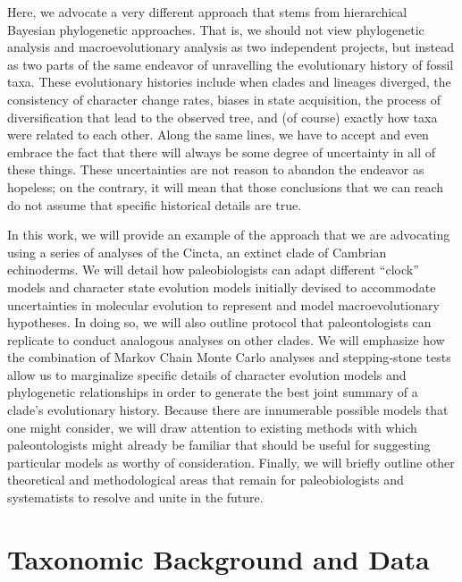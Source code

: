 \documentclass{article}
\begin{document}
Here, we advocate a very different approach that stems from hierarchical Bayesian phylogenetic approaches.  
That is, we should not view phylogenetic analysis and macroevolutionary analysis as two independent projects, but instead as two parts of the same endeavor of unravelling the evolutionary history of fossil taxa.  
These evolutionary histories include when clades and lineages diverged, the consistency of character change rates, biases in state acquisition, the process of diversification that lead to the observed tree, and (of course) exactly how taxa were related to each other.  
Along the same lines, we have to accept and even embrace the fact that there will always be some degree of uncertainty in all of these things.  
These uncertainties are not reason to abandon the endeavor as hopeless; on the contrary, it will mean that those conclusions that we can reach do not assume that specific historical details are true.  

In this work, we will provide an example of the approach that we are advocating using a series of analyses of the Cincta, an extinct clade of Cambrian echinoderms. 
We will detail how paleobiologists can adapt different “clock” models and character state evolution models initially devised to accommodate uncertainties in molecular evolution to represent and model macroevolutionary hypotheses.  
In doing so, we will also outline protocol that paleontologists can replicate to conduct analogous analyses on other clades.  
We will emphasize how the combination of Markov Chain Monte Carlo analyses and stepping‑stone tests allow us to marginalize specific details of character evolution models and phylogenetic relationships in order to generate the best joint summary of a clade’s evolutionary history.  
Because there are innumerable possible models that one might consider, we will draw attention to existing methods with which paleontologists might already be familiar that should be useful for suggesting particular models as worthy of consideration.  
Finally, we will briefly outline other theoretical and methodological areas that remain for paleobiologists and systematists to resolve and unite in the future. 

\section{Taxonomic Background and Data}
\end{document}
